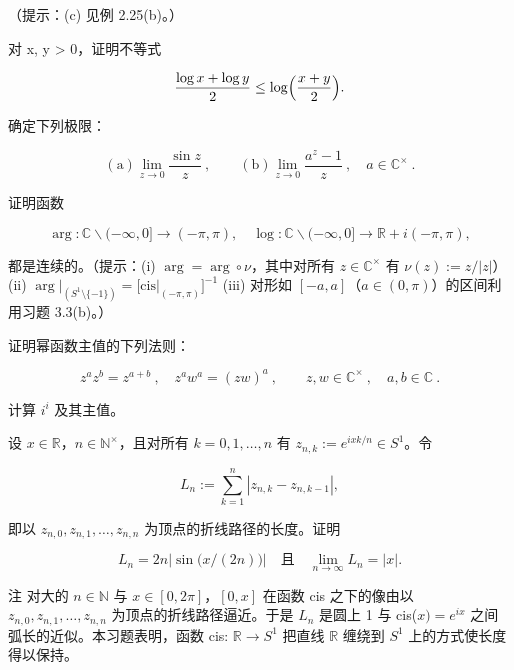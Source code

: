 \begin{exercises}
（提示：(c) 见例 2.25(b)。）

\item

对 x, y > 0，证明不等式

\[
\frac{\log x+\log y}{2}\leq\log\Bigl(\frac{x+y}{2}\Bigr).
\]
\item

确定下列极限：

\[
\mathrm{(a)}\operatorname*{l i m}_{z\to0}\frac{\operatorname{s i n}z}{z}~,\qquad\mathrm{(b)}\operatorname*{l i m}_{z\to0}\frac{a^{z}-1}{z}~,\quad a\in\mathbb{C}^{\times}~.
\]
\item

证明函数

\[
\arg:\mathbb{C}\backslash(-\infty,0]\to(-\pi,\pi),\quad\log:\mathbb{C}\backslash(-\infty,0]\to\mathbb{R}+i(-\pi,\pi),
\]

都是连续的。（提示：(i)  $ \arg = \arg \circ \nu $，其中对所有 $ z \in \mathbb{C}^{\times} $ 有 $ \nu(z) := z/|z| $）(ii)  $ \arg\big|_{(S^{1}\setminus\{-1\})}=\big[\mathrm{cis}\big|_{(-\pi,\pi)}\big]^{-1} $ (iii) 对形如 $ [-a,a] $（$ a\in(0,\pi) $）的区间利用习题 3.3(b)。）

\item

证明幂函数主值的下列法则：

\[
z^{a}z^{b}=z^{a+b}~,\quad z^{a}w^{a}=(z w)^{a}~,\qquad z,w\in\mathbb{C}^{\times}~,\quad a,b\in\mathbb{C}~.
\]
\item

计算 $ i^{i} $ 及其主值。

\item

设 $ x \in \mathbb{R} $，$ n \in \mathbb{N}^\times $，且对所有 $ k = 0,1,\ldots,n $ 有 $ z_{n,k} := e^{ixk/n} \in S^1 $。令

\[
L_{n}:=\sum_{k=1}^{n}\left|z_{n,k}-z_{n,k-1}\right|,
\]

即以 $ z_{n,0}, z_{n,1}, \ldots, z_{n,n} $ 为顶点的折线路径的长度。证明

\[
L_{n}=2n\left|\sin\bigl(x/(2n)\bigr)\right|\quad\text{且}\quad\operatorname*{l i m}_{n\to\infty}L_{n}=\left|x\right|.
\]

注 对大的 $n \in \mathbb{N}$ 与 $x \in [0, 2\pi]$，$[0, x]$ 在函数 cis 之下的像由以 $z_{n,0}, z_{n,1}, \ldots, z_{n,n}$ 为顶点的折线路径逼近。于是 $L_n$ 是圆上 1 与 cis($x) = e^{ix}$ 之间弧长的近似。本习题表明，函数 cis: $\mathbb{R} \to S^1$ 把直线 $\mathbb{R}$ 缠绕到 $S^1$ 上的方式使长度得以保持。


\end{exercises}
